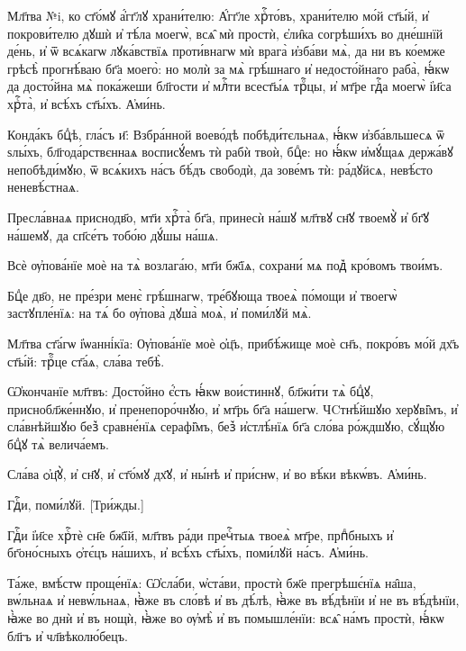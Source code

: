 \documentclass[20pt]{extarticle}
\begin{document}
Мл҃тва №i, ко ст҃о́мꙋ а҆́гг҃лꙋ храни́телю:
А҆́гг҃ле хрⷭ҇то́въ, храни́телю мо́й ст҃ы́й, и҆ покрови́телю дꙋшѝ и҆ тѣ́ла моегѡ̀, всѧ̑ мѝ простѝ, є҆ли̑ка согрѣши́хъ во дне́шнїй де́нь, и҆ ѿ всѧ́кагѡ лꙋка́вствїѧ проти́внагѡ мѝ врага̀ и҆зба́ви мѧ̀, да ни въ ко́емже грѣсѣ̀ прогнѣ́ваю бг҃а моего̀: но молѝ за мѧ̀ грѣ́шнаго и҆ недосто́йнаго раба̀, ꙗ҆́кѡ да досто́йна мѧ̀ пока́жеши бл҃гости и҆ млⷭ҇ти всест҃ы́ѧ трⷪ҇цы, и҆ мт҃ре гдⷭ҇а моегѡ̀ і҆и҃са хрⷭ҇та̀, и҆ всѣ́хъ ст҃ы́хъ. А҆ми́нь.

Конда́къ бцⷣѣ, гла́съ и҃:
Взбра́нной воево́дѣ побѣди́тєльнаѧ, ꙗ҆́кѡ и҆зба́вльшесѧ ѿ ѕлы́хъ, бл҃года́рствєннаѧ восписꙋ́емъ тѝ рабѝ твоѝ, бцⷣе: но ꙗ҆́кѡ и҆мꙋ́щаѧ держа́вꙋ непобѣди́мꙋю, ѿ всѧ́кихъ на́съ бѣ́дъ свободѝ, да зове́мъ тѝ: ра́дꙋйсѧ, невѣ́сто неневѣ́стнаѧ.

Пресла́внаѧ приснодв҃о, мт҃и хрⷭ҇та̀ бг҃а, принесѝ на́шꙋ мл҃твꙋ сн҃ꙋ твоемꙋ̀ и҆ бг҃ꙋ на́шемꙋ, да сп҃се́тъ тобо́ю дꙋ́шы на́шѧ.

Всѐ ѹ҆пова́нїе моѐ на тѧ̀ возлага́ю, мт҃и бж҃їѧ, сохрани́ мѧ под꙽ кро́вомъ твои́мъ.

Бцⷣе дв҃о, не пре́зри менє̀ грѣ́шнагѡ, тре́бꙋюща твоеѧ̀ по́мощи и҆ твоегѡ̀ застꙋпле́нїѧ: на тѧ́ бо ѹ҆пова̀ дꙋша̀ моѧ̀, и҆ поми́лꙋй мѧ̀.

Мл҃тва ст҃а́гѡ і҆ѡанні́кїа:
Ѹ҆пова́нїе моѐ ѻ҆ц҃ъ, прибѣ́жище моѐ сн҃ъ, покро́въ мо́й дх҃ъ ст҃ы́й: трⷪ҇це ст҃а́ѧ, сла́ва тебѣ̀.

Ѡ҆кончанїе мл҃твъ:
Досто́йно є҆́сть ꙗ҆́кѡ вои́стиннꙋ, бл҃жи́ти тѧ̀ бцⷣꙋ, приснобл҃же́ннꙋю, и҆ пренепоро́чнꙋю, и҆ мт҃рь бг҃а на́шегѡ. ЧCтнѣ́йшꙋю херꙋві̑мъ, и҆ сла́внѣйшꙋю без꙽ сравне́нїѧ серафі̑мъ, без꙽ и҆стлѣ́нїѧ бг҃а сло́ва ро́ждшꙋю, сꙋ́щꙋю бцⷣꙋ тѧ̀ велича́емъ.

Сла́ва ѻ҆ц҃ꙋ̀, и҆ сн҃ꙋ, и҆ ст҃о́мꙋ дх҃ꙋ, и҆ ны́нѣ и҆ при́снѡ, и҆ во вѣ́ки вѣкѡ́въ. А҆ми́нь.

Гдⷭ҇и, поми́лꙋй. [Три́жды.]

Гдⷭ҇и і҆и҃се хрⷭ҇тѐ сн҃е бж҃їй, мл҃твъ ра́ди пречⷭ҇тыѧ твоеѧ̀ мт҃ре, прпⷣбныхъ и҆ бг҃оно́сныхъ ѻ҆тє́цъ на́шихъ, и҆ всѣ́хъ ст҃ы́хъ, поми́лꙋй на́съ. А҆ми́нь.

Та́же, вмѣ́стѡ проще́нїѧ:
Ѡ҆сла́би, ѡ҆ста́ви, простѝ бж҃е прегрѣшє́нїѧ на̑ша, вѡ́льнаѧ и҆ невѡ́льнаѧ, ꙗ҆̀же въ сло́вѣ и҆ въ дѣ́лѣ, ꙗ҆̀же въ вѣ́дѣнїи и҆ не въ вѣ́дѣнїи, ꙗ҆̀же во днѝ и҆ въ нощѝ, ꙗ҆̀же во ѹ҆мѣ̀ и҆ въ помышле́нїи: всѧ̑ на́мъ простѝ, ꙗ҆́кѡ бл҃гъ и҆ чл҃вѣколю́бецъ.
\end{document}
